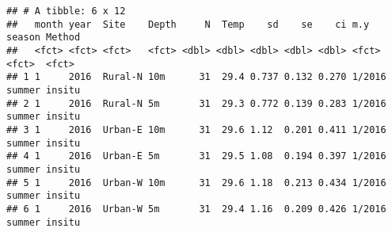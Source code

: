 \documentclass[
]{article}
\newenvironment{Shaded}{\begin{snugshade}}{\end{snugshade}}
\newcommand{\CommentTok}[1]{\textcolor[rgb]{0.56,0.35,0.01}{\textit{#1}}}
\newcommand{\DataTypeTok}[1]{\textcolor[rgb]{0.13,0.29,0.53}{#1}}
\newcommand{\KeywordTok}[1]{\textcolor[rgb]{0.13,0.29,0.53}{\textbf{#1}}}
\newcommand{\NormalTok}[1]{#1}
\newcommand{\OperatorTok}[1]{\textcolor[rgb]{0.81,0.36,0.00}{\textbf{#1}}}
\newcommand{\StringTok}[1]{\textcolor[rgb]{0.31,0.60,0.02}{#1}}
\begin{document}
\begin{Shaded}
\end{Shaded}

\begin{verbatim}
## # A tibble: 6 x 12
##   month year  Site    Depth     N  Temp    sd    se    ci m.y    season Method
##   <fct> <fct> <fct>   <fct> <dbl> <dbl> <dbl> <dbl> <dbl> <fct>  <fct>  <fct> 
## 1 1     2016  Rural-N 10m      31  29.4 0.737 0.132 0.270 1/2016 summer insitu
## 2 1     2016  Rural-N 5m       31  29.3 0.772 0.139 0.283 1/2016 summer insitu
## 3 1     2016  Urban-E 10m      31  29.6 1.12  0.201 0.411 1/2016 summer insitu
## 4 1     2016  Urban-E 5m       31  29.5 1.08  0.194 0.397 1/2016 summer insitu
## 5 1     2016  Urban-W 10m      31  29.6 1.18  0.213 0.434 1/2016 summer insitu
## 6 1     2016  Urban-W 5m       31  29.4 1.16  0.209 0.426 1/2016 summer insitu
\end{verbatim}
\end{document}
